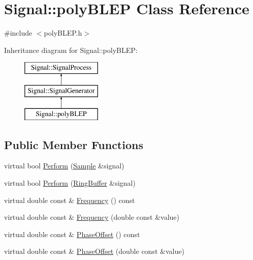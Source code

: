 \hypertarget{class_signal_1_1poly_b_l_e_p}{\section{Signal\+:\+:poly\+B\+L\+E\+P Class Reference}
\label{class_signal_1_1poly_b_l_e_p}
}


{\ttfamily \#include $<$poly\+B\+L\+E\+P.\+h$>$}

Inheritance diagram for Signal\+:\+:poly\+B\+L\+E\+P\+:\begin{figure}[H]
\begin{center}
\leavevmode
\includegraphics[height=3.000000cm]{class_signal_1_1poly_b_l_e_p}
\end{center}
\end{figure}
\subsection*{Public Member Functions}
\begin{DoxyCompactItemize}
\item 
virtual bool \hyperlink{class_signal_1_1_signal_generator_a2cd9061c5ae40a392a9476551b4379f3}{Perform} (\hyperlink{class_signal_1_1_sample}{Sample} \&signal)
\item 
virtual bool \hyperlink{class_signal_1_1_signal_generator_a126d52dd9b6b14d33efc624e2c89284e}{Perform} (\hyperlink{class_signal_1_1_ring_buffer}{Ring\+Buffer} \&signal)
\item 
virtual double const \& \hyperlink{class_signal_1_1_signal_generator_a96af42ee68f94e9b04d034fd68b73ecd}{Frequency} () const 
\item 
virtual double const \& \hyperlink{class_signal_1_1_signal_generator_af83b532bf3ddc3637c2fd7a1dfd095cb}{Frequency} (double const \&value)
\item 
virtual double const \& \hyperlink{class_signal_1_1_signal_generator_ac2538ec946f001e394d2416fda698d1c}{Phase\+Offset} () const 
\item 
virtual double const \& \hyperlink{class_signal_1_1_signal_generator_ac6a103ff72beaa338f6d18c812522d78}{Phase\+Offset} (double const \&value)
\end{DoxyCompactItemize}
